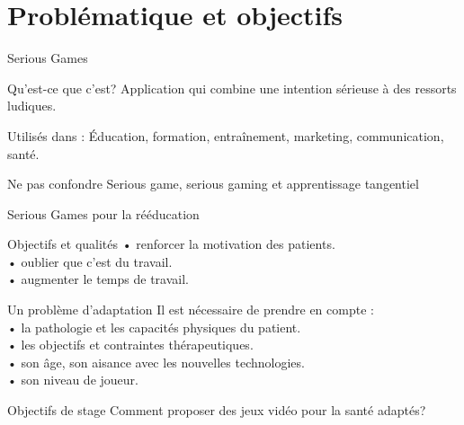 \documentclass{beamer}
\begin{document}
	\section{Problématique et objectifs}
		\begin{frame}{Serious Games}
			\begin{block}{Qu'est-ce que c'est?}
				Application qui combine une intention sérieuse à des ressorts ludiques.
			\end{block}\pause
			\begin{exampleblock}{Utilisés dans :}
				Éducation, formation, entraînement, marketing, communication, santé.
			\end{exampleblock}	\pause
			\begin{alertblock}{Ne pas confondre}
				Serious game, serious gaming et apprentissage tangentiel
			\end{alertblock}
		\end{frame}
	
		\begin{frame}{Serious Games pour la rééducation}
			\begin{exampleblock}{Objectifs et qualités}
				• renforcer la motivation des patients.\\
				• oublier que c'est du travail. \\
				• augmenter le temps de travail.
			\end{exampleblock}\pause
			\begin{alertblock}{Un problème d'adaptation}
			Il est nécessaire de prendre en compte :\\
					• la pathologie et les capacités physiques du patient.\\
					• les objectifs et contraintes thérapeutiques.\\
					• son âge, son aisance avec les nouvelles technologies.\\
					• son niveau de joueur.
			\end{alertblock}
		\end{frame}
	
		\begin{frame}{Objectifs de stage}		
			\large{Comment proposer des jeux vidéo pour la santé adaptés?}
		\end{frame}
		
\end{document}
